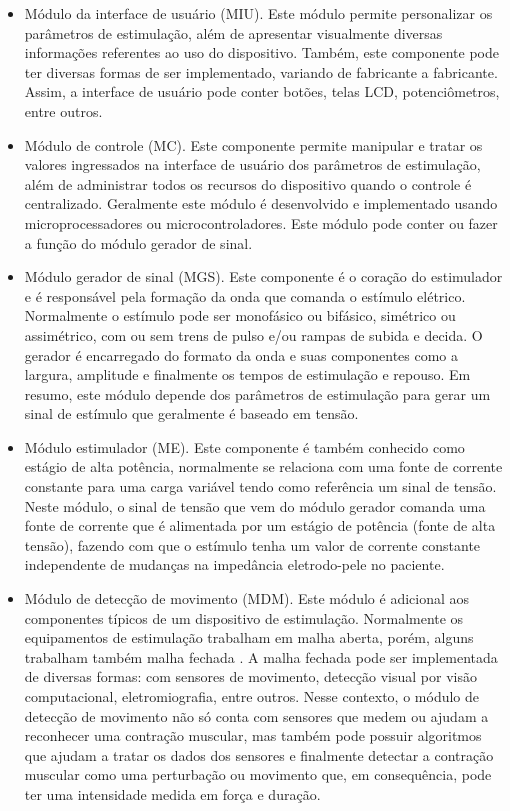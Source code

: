 \begin{itemize}
    \item Módulo da interface de usuário (\acrshort{MIU}). Este módulo permite personalizar os parâmetros de estimulação, além de apresentar visualmente diversas informações referentes ao uso do dispositivo. Também, este componente pode ter diversas formas de ser implementado, variando de fabricante a fabricante. Assim, a interface de usuário pode conter botões, telas \acrshort{LCD}, potenciômetros, entre outros.
    
    \item Módulo de controle (\acrshort{MC}). Este componente permite manipular e tratar os valores ingressados na interface de usuário dos parâmetros de estimulação, além de administrar todos os recursos do dispositivo quando o controle é centralizado. Geralmente este módulo é desenvolvido e implementado usando microprocessadores ou microcontroladores. Este módulo pode conter ou fazer a função do módulo gerador de sinal.
    
    \item Módulo gerador de sinal (\acrshort{MGS}). Este componente é o coração do estimulador e é responsável pela formação da onda que comanda o estímulo elétrico. Normalmente o estímulo pode ser monofásico ou bifásico, simétrico ou assimétrico, com ou sem trens de pulso e/ou rampas de subida e decida. O gerador é encarregado do formato da onda e suas componentes como a largura, amplitude e finalmente os tempos de estimulação e repouso. Em resumo, este módulo depende dos parâmetros de estimulação para gerar um sinal de estímulo que geralmente é baseado em tensão.
    
    \item Módulo estimulador (\acrshort{ME}). Este componente é também conhecido como estágio de alta potência, normalmente se relaciona com uma fonte de corrente constante para uma carga variável tendo como referência um sinal de tensão. Neste módulo, o sinal de tensão que vem do módulo gerador comanda uma fonte de corrente que é alimentada por um estágio de potência (fonte de alta tensão), fazendo com que o estímulo tenha um valor de corrente constante independente de mudanças na impedância eletrodo-pele no paciente. 
    
    \item Módulo de detecção de movimento (\acrshort{MDM}). Este módulo é adicional aos componentes típicos de um dispositivo de estimulação. Normalmente os equipamentos de estimulação trabalham em malha aberta, porém, alguns trabalham também malha fechada \cite{Sanches2013}. A malha fechada pode ser implementada de diversas formas: com sensores de movimento, detecção visual por visão computacional, eletromiografia, entre outros. Nesse contexto, o módulo de detecção de movimento não só conta com sensores que medem ou ajudam a reconhecer uma contração muscular, mas também pode possuir algoritmos que ajudam a tratar os dados dos sensores e finalmente detectar a contração muscular como uma perturbação ou movimento que, em consequência, pode ter uma intensidade medida em força e duração.

\end{itemize}


